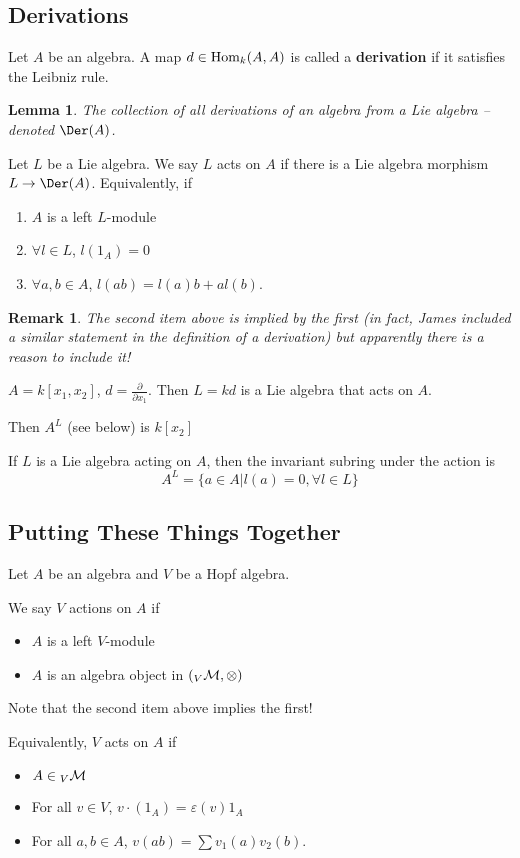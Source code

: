 \documentclass[12pt]{article}
\theoremstyle{break}
\theoremstyle{nonumberbreak}
\theoremstyle{changebreak}
\newtheorem{lem}[thm]{Lemma}
\theoremstyle{break}
\theoremstyle{nonumberbreak}
\theoremstyle{nonumberplain}
\theoremstyle{change}
\newtheorem{rmk}[thm]{Remark}
\newcommand*{\Hom}{\ensuremath\text{Hom}}
\begin{document}
\subsection{Derivations}
\begin{defn}
	Let $A$ be an algebra. A map $d\in\Hom_k(A,A)$ is called a \textbf{derivation} if
	it satisfies the Leibniz rule.
\end{defn}
\begin{lem}
	The collection of all derivations of an algebra from a Lie algebra -- denoted $\Der(A)$.
\end{lem}
\begin{defn}
	Let $L$ be a Lie algebra. We say $L$ acts on $A$ if there is a Lie algebra morphism $L\to \Der(A)$.
	Equivalently, if
	\begin{enumerate}
		\item $A$ is a left $L$-module
		\item $\forall l\in L$, $l(1_A)=0$
		\item $\forall a,b\in A$, $l(ab)=l(a)b+al(b)$.
	\end{enumerate}
\end{defn}
\begin{rmk}
	The second item above is implied by the first (in fact, James included a similar statement in 
	the definition of a derivation) but apparently there is a reason to include it!
\end{rmk}
\begin{ex}
	$A=k[x_1,x_2]$, $d=\frac{\partial}{\partial x_1}$. Then $L=kd$ is a Lie algebra that acts on $A$.

	Then $A^L$ (see below) is $k[x_2]$
\end{ex}
\begin{defn}
	If $L$ is a Lie algebra acting on $A$, then the invariant subring under the action is
	\[A^L=\{a\in A|l(a)=0,\forall l\in L\}\]
\end{defn}

\subsection{Putting These Things Together}
Let $A$ be an algebra and $V$ be a Hopf algebra.
\begin{defn}
	We say $V$ actions on $A$ if
	\begin{itemize}
		\item $A$ is a left $V$-module
		\item $A$ is an algebra object in $({_V\cal M},\otimes)$
	\end{itemize}
	Note that the second item above implies the first!

	Equivalently, $V$ acts on $A$ if
	\begin{itemize}
		\item $A\in {_V\cal M}$
		\item For all $v\in V$, $v\cdot(1_A)=\varepsilon(v)1_A$
		\item For all $a,b\in A$, $v(ab)=\sum v_1(a)v_2(b)$.
	\end{itemize}
\end{defn}
\end{document}

